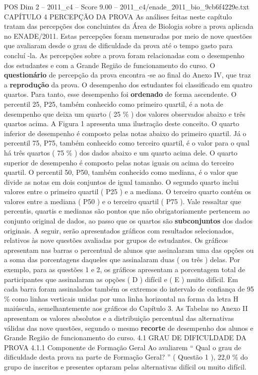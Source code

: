 \begin{textsample}{POS Dim 2 – 2011\_c4 – Score 9.00 – 2011\_c4/enade\_2011\_bio\_9cb6f4229e.txt}  \label{ex:f2_pos_129}
CAPÍTULO 4 PERCEPÇÃO DA PROVA As análises feitas neste capítulo tratam das percepções dos concluintes da Área de Biologia sobre a prova aplicada no ENADE/2011.
Estas percepções foram mensuradas por meio de nove questões que avaliaram desde o grau de dificuldade da prova até o tempo gasto para concluí -la.
As percepções sobre a prova foram relacionadas com o desempenho dos estudantes e com a Grande Região de funcionamento do curso.
O \textbf{questionário} de percepção da prova encontra -se ao final do Anexo IV, que traz a \textbf{reprodução} da prova.
O desempenho dos estudantes foi classificado em quatro quartos.
Para tanto, esse desempenho foi \textbf{ordenado} de forma ascendente.
O percentil 25, P25, também conhecido como primeiro quartil, é a nota de desempenho que deixa um quarto ( 25 \% ) dos valores observados abaixo e três quartos acima.
A Figura 1 apresenta uma ilustração deste conceito.
O quarto inferior de desempenho é composto pelas notas abaixo do primeiro quartil.
Já o percentil 75, P75, também conhecido como terceiro quartil, é o valor para o qual há três quartos ( 75 \% ) dos dados abaixo e um quarto acima dele.
O quarto superior de desempenho é composto pelas notas iguais ou acima do terceiro quartil.
O percentil 50, P50, também conhecido como mediana, é o valor que divide as notas em dois conjuntos de igual tamanho.
O segundo quarto inclui valores entre o primeiro quartil ( P25 ) e a mediana.
O terceiro quarto contém os valores entre a mediana ( P50 ) e o terceiro quartil ( P75 ).
Vale ressaltar que percentis, quartis e medianas são pontos que não obrigatoriamente pertencem ao conjunto original de dados, ao passo que os quartos são \textbf{subconjuntos} dos dados originais.
A seguir, serão apresentados gráficos com resultados selecionados, relativos às nove questões avaliadas por grupos de estudantes.
Os gráficos apresentam nas barras o percentual de alunos que assinalaram uma das opções ou a soma das porcentagens daqueles que assinalaram duas ( ou três ) delas.
Por exemplo, para as questões 1 e 2, os gráficos apresentam a porcentagem total de participantes que assinalaram as opções ( D ) difícil e ( E ) muito difícil.
Em cada barra foram assinalados também os extremos do intervalo de confiança de 95 \% como linhas verticais unidas por uma linha horizontal na forma da letra H maiúscula, semelhantemente aos gráficos do Capítulo 3.
As Tabelas no Anexo II apresentam os valores absolutos e a distribuição percentual das alternativas válidas das nove questões, segundo o mesmo \textbf{recorte} de desempenho dos alunos e Grande Região de funcionamento do curso. 4.1 GRAU DE DIFICULDADE DA PROVA 4.1.1 Componente de Formação Geral Ao avaliarem “ Qual o grau de dificuldade desta prova na parte de Formação Geral? ” ( Questão 1 ), 22,0 \% do grupo de inscritos e presentes optaram pelas alternativas difícil ou muito difícil.

\end{textsample}
